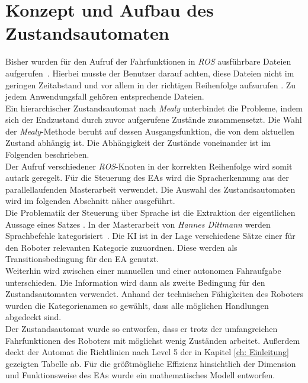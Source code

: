 		
	\section{Konzept und Aufbau des Zustandsautomaten}
	\label{sec: Umsetzung der Statemachine}
	Bisher wurden für den Aufruf der Fahrfunktionen in \textit{ROS} ausführbare Dateien aufgerufen~\cite{Bachelorarbeit}. Hierbei musste der Benutzer darauf achten, diese Dateien nicht im geringen Zeitabstand und vor allem in der richtigen Reihenfolge aufzurufen \cite{Bachelorarbeit}. Zu jedem Anwendungsfall gehören entsprechende Dateien. \\
	
	Ein hierarchischer Zustandsautomat nach \textit{Mealy} unterbindet die Probleme, indem sich der Endzustand durch zuvor aufgerufene Zustände zusammensetzt. Die Wahl der \textit{Mealy}-Methode beruht auf dessen Ausgangsfunktion, die von dem aktuellen Zustand abhängig ist. Die Abhängigkeit der Zustände voneinander ist im Folgenden beschrieben.\\
	
	Der Aufruf verschiedener \textit{ROS}-Knoten in der korrekten Reihenfolge wird somit autark geregelt. Für die Steuerung des EAs wird die Spracherkennung aus der parallellaufenden Masterarbeit verwendet. Die Auswahl des Zustandsautomaten wird im folgenden Abschnitt näher ausgeführt.\\	
	
	Die Problematik der Steuerung über Sprache ist die Extraktion der eigentlichen Aussage eines Satzes \cite{Dittmann}. In der Masterarbeit von \textit{Hannes Dittmann} werden Sprachbefehle kategorisiert~\cite{Dittmann}. Die KI ist in der Lage verschiedene Sätze einer für den Roboter relevanten Kategorie zuzuordnen. Diese werden als Transitionsbedingung für den EA genutzt.\\
	
	Weiterhin wird zwischen einer manuellen und einer autonomen Fahraufgabe unterschieden. Die Information wird dann als zweite Bedingung für den Zustandsautomaten verwendet. Anhand der technischen Fähigkeiten des Roboters wurden die Kategorienamen so gewählt, dass alle möglichen Handlungen abgedeckt sind.\\
	
	 Der Zustandsautomat wurde so entworfen, dass er trotz der umfangreichen Fahrfunktionen des Roboters mit möglichst wenig Zuständen arbeitet. Außerdem deckt der Automat die Richtlinien nach Level 5 der in Kapitel \ref{ch: Einleitung} gezeigten Tabelle ab. Für die größtmögliche Effizienz hinsichtlich der Dimension und Funktionsweise des EAs wurde ein mathematisches Modell entworfen.\\
	
